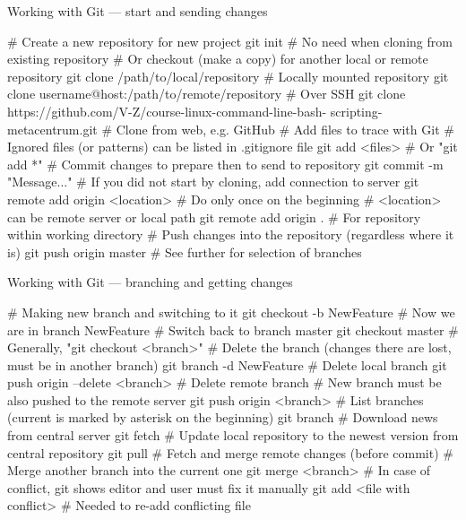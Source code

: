 \documentclass[compress, ucs, xelatex, 11pt, xcolor=svgnames,
  hyperref={
    bookmarks=true,
    unicode=true,
    colorlinks=true,
    pdftitle={Linux, command line and MetaCentrum},
    plainpages=false,
    pdfauthor={Vojtech Zeisek},
    pdfsubject={Course about use of Linux command line, writing shell scripts and using MetaCentrum of CESNET},
    pdfcreator={XeLaTeX},
    pdfkeywords={Linux, GNU, BASH, shell, command line, MetaCentrum},
    linkcolor=DarkRed,
    anchorcolor=DarkBlue,
    citecolor=Indigo,
    filecolor=NavyBlue,
    menucolor=DarkMagenta,
    urlcolor=DarkBlue,
    pdftex},
  url={hyphens, lowtilde} %
  ]{beamer}
\begin{document}
\begin{frame}[fragile]{Working with Git --- start and sending changes}
  \begin{bashcode}
    # Create a new repository for new project
    git init # No need when cloning from existing repository
    # Or checkout (make a copy) for another local or remote repository
    git clone /path/to/local/repository # Locally mounted repository
    git clone username@host:/path/to/remote/repository # Over SSH
    git clone https://github.com/V-Z/course-linux-command-line-bash-
      scripting-metacentrum.git # Clone from web, e.g. GitHub
    # Add files to trace with Git
    # Ignored files (or patterns) can be listed in .gitignore file
    git add <files> # Or "git add *"
    # Commit changes to prepare then to send to repository
    git commit -m "Message..."
    # If you did not start by cloning, add connection to server
    git remote add origin <location> # Do only once on the beginning
    # <location> can be remote server or local path
    git remote add origin . # For repository within working directory
    # Push changes into the repository (regardless where it is)
    git push origin master # See further for selection of branches
  \end{bashcode}
\end{frame}

\begin{frame}[fragile]{Working with Git --- branching and getting changes}
  \begin{bashcode}
    # Making new branch and switching to it
    git checkout -b NewFeature # Now we are in branch NewFeature
    # Switch back to branch master
    git checkout master # Generally, "git checkout <branch>"
    # Delete the branch (changes there are lost, must be in another branch)
    git branch -d NewFeature # Delete local branch
    git push origin --delete <branch> # Delete remote branch
    # New branch must be also pushed to the remote server
    git push origin <branch>
    # List branches (current is marked by asterisk on the beginning)
    git branch
    # Download news from central server
    git fetch
    # Update local repository to the newest version from central repository
    git pull # Fetch and merge remote changes (before commit)
    # Merge another branch into the current one
    git merge <branch>
    # In case of conflict, git shows editor and user must fix it manually
    git add <file with conflict> # Needed to re-add conflicting file
  \end{bashcode}
\end{frame}
\end{document}
